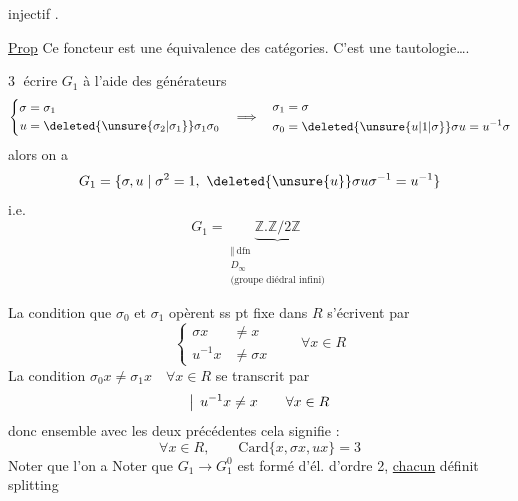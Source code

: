 injectif\unsure{)|]} .

\uline{Prop} Ce foncteur
est une équivalence des catégories.
C'est une tautologie\ldots.

\textcircled{\small 3}  écrire $G_1$  à l'aide des
générateurs 
\[
\left\{\begin{aligned}\sigma&=\sigma_1\\u&=\deleted{\unsure{\sigma_2|\sigma_1}}\sigma_1\sigma_0\end{aligned}\right.
\quad\Longrightarrow\quad
\begin{aligned}\sigma_1&=\sigma\\\sigma_0&=\deleted{\unsure{u|1|\sigma}}\sigma u=u^{-1}\sigma\end{aligned}
\]
alors on a
\[
G_1=\{\sigma,u\mid\sigma^2=1,\ \deleted{\unsure{u}}\sigma u\sigma^{-1}=u^{-1}\}
\]
i.e.
\[
G_1=\underbrace{\mathbb Z.\mathbb Z/2\mathbb Z}_{\substack{\Vert\ \mathrm{dfn}\\D_\infty\\\text{(groupe diédral infini)}}}
\]

La condition que  $\sigma_0$ et $\sigma_1$  opèrent ss pt
fixe dans $R$ s'écrivent par
\[
\left\{\begin{aligned}\sigma x&\ne x\\u^{-1}x&\ne\sigma x\end{aligned}\right.\qquad\forall x\in R
\]
La condition $\sigma_0x\ne\sigma_1x\quad\forall x\in R$ se transcrit par
\[
\bigm|\,u^{-1}x\ne x\qquad\forall x\in R
\]
donc ensemble avec les deux précédentes
cela signifie :
\[
\forall x\in R,\qquad\mathrm{Card}\{x,\sigma x,ux\}=3
\]
Noter que l'on a
Noter que $G_1\to G_1^{0}$ est formé d'él. d'ordre 2, \uline{chacun} définit splitting
